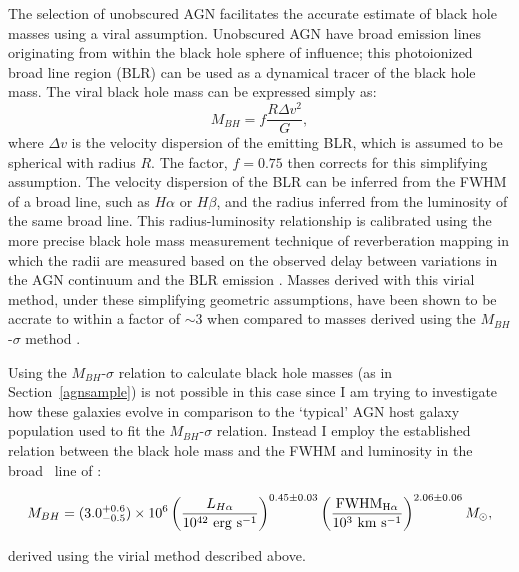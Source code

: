 The selection of unobscured AGN facilitates the accurate estimate of black hole masses using a viral assumption. Unobscured AGN have broad emission lines originating from within the black hole sphere of influence; this photoionized broad line region (BLR) can be used as a dynamical tracer of the black hole mass. The viral black hole mass \citep{peterson14} can be expressed simply as:
\begin{equation}\label{eq:virial}
M_{BH} = f \frac{R\Delta v^2}{G},
\end{equation}
where $\Delta v$ is the velocity dispersion of the emitting BLR, which is assumed to be spherical with radius $R$. The factor, $f = 0.75$ \citep{netzer90} then corrects for this simplifying assumption. The velocity dispersion of the BLR can be inferred from the FWHM of a broad line, such as $H\alpha$ or $H\beta$, and the radius inferred from the luminosity of the same broad line. This radius-luminosity relationship is calibrated using the more precise black hole mass measurement technique of reverberation mapping \citep{blandford82, peterson01, barth15} in which the radii are measured based on the observed delay between variations in the AGN continuum and the BLR emission \citep{kaspi05, bentz06}. Masses derived with this virial method, under these simplifying geometric assumptions, have been shown to be accrate to within a factor of $\sim 3$ when compared to masses derived using the $M_{BH}$-$\sigma$ method \citep[][and see Section~\ref{agnsample}]{ferarese01, nelson04, onken04}.

Using the $M_{BH}$-$\sigma$ relation to calculate black hole masses (as in Section~\ref{agnsample}) is not possible in this case since I am trying to investigate how these galaxies evolve in comparison to the `typical' AGN host galaxy population used to fit the $M_{BH}$-$\sigma$ relation. Instead I employ the established relation between the black hole mass and the FWHM and luminosity in the broad \ha\ line of \citet{gh07a}:

\begin{equation}\label{greeneho}
M_{BH} = (3.0^{+0.6}_{-0.5}) \times 10^6 \left ( \frac{L_{H\alpha}}{10^{42} ~\rm{erg}~\rm{s}^{-1}} \right )^{0.45\pm0.03} \left ( \frac{\rm{FWHM}_{H\alpha}}{10^{3}~\rm{km}~\rm{s}^{-1}} \right )^{2.06\pm0.06} M_{\odot},
\end{equation}

derived using the virial method described above. 

